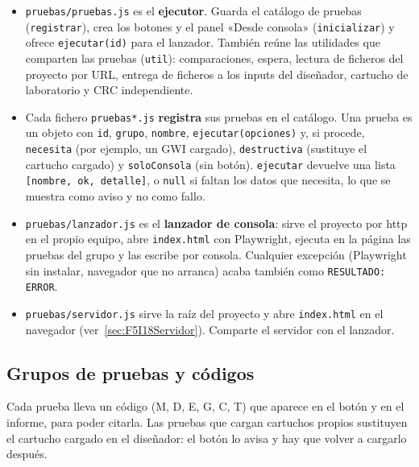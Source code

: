 \begin{itemize}
	\item \texttt{pruebas/pruebas.js} es el \textbf{ejecutor}. Guarda el catálogo de pruebas (\texttt{registrar}), crea los botones y el panel «Desde consola» (\texttt{inicializar}) y ofrece \texttt{ejecutar(id)} para el lanzador. También reúne las utilidades que comparten las pruebas (\texttt{util}): comparaciones, espera, lectura de ficheros del proyecto por URL, entrega de ficheros a los inputs del diseñador, cartucho de laboratorio y CRC independiente.
	\item Cada fichero \texttt{pruebas*.js} \textbf{registra} sus pruebas en el catálogo. Una prueba es un objeto con \texttt{id}, \texttt{grupo}, \texttt{nombre}, \texttt{ejecutar(opciones)} y, si procede, \texttt{necesita} (por ejemplo, un GWI cargado), \texttt{destructiva} (sustituye el cartucho cargado) y \texttt{soloConsola} (sin botón). \texttt{ejecutar} devuelve una lista \texttt{[nombre, ok, detalle]}, o \texttt{null} si faltan los datos que necesita, lo que se muestra como aviso y no como fallo.
	\item \texttt{pruebas/lanzador.js} es el \textbf{lanzador de consola}: sirve el proyecto por http en el propio equipo, abre \texttt{index.html} con Playwright, ejecuta en la página las pruebas del grupo y las escribe por consola. Cualquier excepción (Playwright sin instalar, navegador que no arranca) acaba también como \texttt{RESULTADO: ERROR}.
	\item \texttt{pruebas/servidor.js} sirve la raíz del proyecto y abre \texttt{index.html} en el navegador (ver~\ref{sec:F5I18Servidor}). Comparte el servidor con el lanzador.
\end{itemize}

\subsection{Grupos de pruebas y códigos}
\label{sec:F5I18Grupos}

Cada prueba lleva un código (M, D, E, G, C, T) que aparece en el botón y en el informe, para poder citarla. Las pruebas que cargan cartuchos propios sustituyen el cartucho cargado en el diseñador: el botón lo avisa y hay que volver a cargarlo después.

